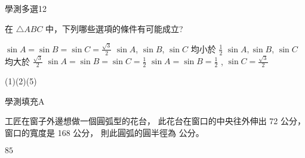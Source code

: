     \begin{QUESTION}
        \begin{ExamInfo}{91}{學測}{多選}{12}
        \end{ExamInfo}
        \begin{ExamAnsRateInfo}{36}{67}{29}{12}
        \end{ExamAnsRateInfo}
        \begin{QBODY}
            在 $\triangle ABC$ 中，下列哪些選項的條件有可能成立?
            \begin{QOPS} 
                \QOP $\sin A=\sin B= \sin C= \frac{\sqrt{3}}{2}$ 
                \QOP $\sin A$, $\sin B$, $\sin C$ 均小於 $\frac{1}{2}$ 
                \QOP $\sin A, \sin B$, $\sin C$ 均大於 $\frac{\sqrt{3}}{2}$ 
                \QOP $\sin A = \sin B = \sin C =\frac{1}{2}$ 
                \QOP $\sin A= \sin B= \frac{1}{2}$ , $\sin C= \frac{\sqrt{3}}{2}$
            \end{QOPS}
        \end{QBODY}
        \begin{QFROMS}
        \end{QFROMS}
        \begin{QTAGS}\end{QTAGS}
        \begin{QANS}
            (1)(2)(5)
        \end{QANS}
        \begin{QSOLLIST}
        \end{QSOLLIST}
        \begin{QEMPTYSPACE}
        \end{QEMPTYSPACE}
    \end{QUESTION}
    \begin{QUESTION}
        \begin{ExamInfo}{91}{學測}{填充}{A}
        \end{ExamInfo}
        \begin{ExamAnsRateInfo}{28}{65}{17}{2}
        \end{ExamAnsRateInfo}
        \begin{QBODY}
            工匠在窗子外邊想做一個圓弧型的花台，
            此花台在窗口的中央往外伸出 72 公分，
            窗口的寬度是 168 公分，
            則此圓弧的圓半徑為 
            \TCNBOX{\TCN\TCN} 公分。
        \end{QBODY}
        \begin{QFROMS}
        \end{QFROMS}
        \begin{QTAGS}\end{QTAGS}
        \begin{QANS}
            $85$
        \end{QANS}
        \begin{QSOLLIST}
        \end{QSOLLIST}
        \begin{QEMPTYSPACE}
        \end{QEMPTYSPACE}
    \end{QUESTION}
